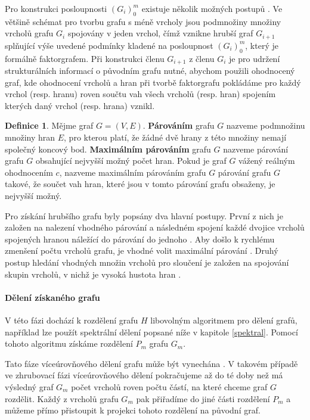 \documentclass[11pt,american,czech,oneside]{book}
\theoremstyle{plain}
\theoremstyle{definition}
\newtheorem{definition}{Definice}
\begin{document}
Pro konstrukci posloupnosti $(G_i)_0^m$ existuje několik možných postupů \cite{lehe:95,lehe:94}. Ve většině schémat pro tvorbu grafu s méně vrcholy jsou podmnožiny množiny vrcholů grafu $G_i$ spojovány v jeden vrchol, čímž vznikne hrubší graf $G_{i+1}$ splňující výše uvedené podmínky kladené na posloupnost $(G_i)_0^m$, který je formálně faktorgrafem. Při konstrukci členu $G_{i+1}$ z členu $G_i$ je pro udržení strukturálních informací o původním grafu nutné, abychom použili ohodnocený graf, kde ohodnocení vrcholů a hran při tvorbě faktorgrafu pokládáme pro každý vrchol (resp. hranu) roven součtu vah všech vrcholů (resp. hran) spojením kterých daný vrchol (resp. hrana) vznikl. 

\begin{definition}
  Mějme graf $G = (V, E)$. \textbf{Párováním} grafu $G$ nazveme podmnožinu množiny hran $E$, pro kterou platí, že žádné dvě hrany z této množiny nemají společný koncový bod. \textbf{Maximálním párováním} grafu $G$ nazveme párování grafu $G$ obsahující nejvyšší možný počet hran. Pokud je graf $G$ vážený reálným ohodnocením $c$, nazveme maximálním párováním grafu $G$ párování grafu $G$ takové, že součet vah hran, které jsou v tomto párování grafu obsaženy, je nejvyšší možný.
\end{definition}

Pro získání hrubšího grafu byly popsány dva hlavní postupy. První z nich je založen na nalezení vhodného párování a následném spojení každé dvojice vrcholů spojených hranou náležící do párování do jednoho \cite{edmo:65,lawl:76}. Aby došlo k rychlému zmenšení počtu vrcholů grafu, je vhodné volit maximální párování \cite{hele:95}. Druhý postup hledání vhodných množin vrcholů pro sloučení je založen na spojování skupin vrcholů, v nichž je vysoká hustota hran \cite{lehe:94}.

\paragraph{Dělení získaného grafu}
V této fázi dochází k rozdělení grafu $H$ libovolným algoritmem pro dělení grafů, například lze použít spektrální dělení popsané níže v kapitole \ref{spektral}. Pomocí tohoto algoritmu získáme rozdělení $P_m$ grafu $G_m$.

Tato fáze víceúrovňového dělení grafu může být vynechána \cite{kaku:95}. V takovém případě ve zhrubovací fázi víceúrovňového dělení pokračujeme až do té doby než má výsledný graf $G_m$ počet vrcholů roven počtu částí, na které chceme graf $G$ rozdělit. Každý z vrcholů grafu $G_m$ pak přiřadíme do jiné části rozdělení $P_m$ a můžeme přímo přistoupit k projekci tohoto rozdělení na původní graf.
\end{document}
